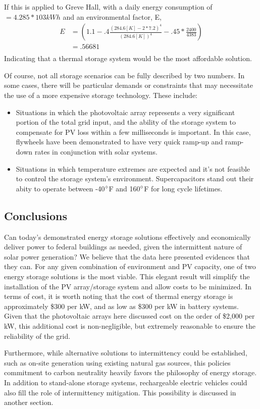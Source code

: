 If this is applied to Greve Hall, with a daily energy consumption of $=4.285*103
kWh$ and an environmental factor, E, 
\begin{equation}
\begin{aligned}
E &=(1.1-.4\frac{(284.6[K]-2*7.2)^4}{(284.6[K])^4}-.45*\frac{2400}{4383})\\
&=.56681\\
\end{aligned}
\end{equation} 
Indicating that a thermal storage system would be the most affordable solution.

Of course, not all storage scenarios can be fully described by two numbers. In
some cases, there will be particular demands or constraints that may
necessitate the use of a more expensive storage technology. These include:
\begin{itemize}
\item Situations in which the photovoltaic array represents a very significant
portion of the total grid input, and the ability of the storage system to
compensate for PV loss within a few milliseconds is important. In this case,
flywheels have been demonstrated to have very quick ramp-up and ramp-down rates
in conjunction with solar systems.
\item Situations in which temperature extremes are expected and it's not
feasible to control the storage system's environment. Supercapacitors stand out their abity
to operate between -40$\degree$F and 160$\degree$F for long cycle lifetimes.
\end{itemize}

\subsection{Conclusions}

Can today's demonstrated energy storage solutions effectively and economically
deliver power to federal buildings as needed, given the intermittent nature of
solar power generation? We believe that the data here presented evidences that
they can. For any given combination of environment and PV capacity, one of two
energy storage solutions is the most viable. This elegant result will simplify
the installation of the PV array/storage system and allow costs to be
minimized. In terms of cost, it is worth noting that the cost of thermal energy
storage is approximately \$300 per kW, and as low as \$300 per kW in battery
systems. Given that the photovoltaic arrays here discussed cost on the order of
\$2,000 per kW, this additional cost is non-negligible, but extremely reasonable
to ensure the reliability of the grid.

Furthermore, while alternative solutions to intermittency could be established,
such as on-site generation using existing natural gas sources, this policies
commitment to carbon neutrality heavily favors the philosophy of energy
storage. In addition to stand-alone storage systems, rechargeable electric
vehicles could also fill the role of intermittency mitigation. This possibility
is discussed in another section.

